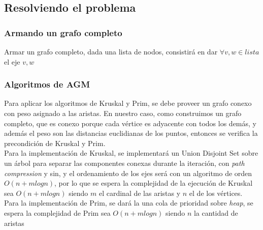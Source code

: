 \subsection{Resolviendo el problema}


\subsubsection{Armando un grafo completo}
Armar un grafo completo, dada una lista de nodos, consistirá en dar $\forall v,w \in lista$ el eje ${v,w}$

\vskip 8pt



\subsubsection{Algoritmos de AGM}

Para aplicar los algoritmos de Kruskal y Prim, se debe proveer un grafo conexo con peso asignado a las aristas. En nuestro caso, como construimos un grafo completo, que es conexo porque cada vértice es adyacente con todos los demás, y además el peso son las distancias euclidianas de los puntos, entonces se verifica la precondición de Kruskal y Prim. \\
Para la implementación de Kruskal, se implementará un Union Disjoint Set sobre un árbol para separar las componentes conexas durante la iteración, con \textit{path compression} y sin, y el ordenamiento de los ejes será con un algoritmo de orden $O(n + m log n)$, por lo que se espera la complejidad de la ejecución de Kruskal sea $O(n + mlogn)$ siendo $m$ el cardinal de las aristas y $n$ el de los vértices. \\
Para la implementación de Prim, se dará la una cola de prioridad sobre \textit{heap}, se espera la complejidad de Prim sea $O(n + mlogn)$ siendo $n$ la cantidad de aristas

